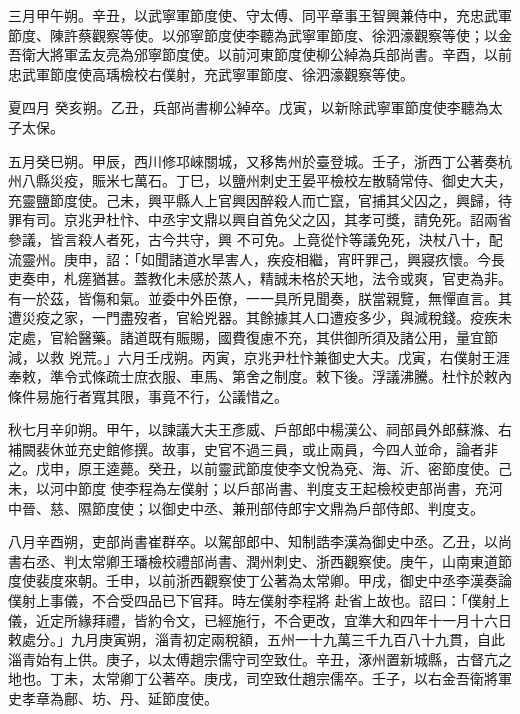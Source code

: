 \begin{pinyinscope}
 三月甲午朔。辛丑，以武寧軍節度使、守太傅、同平章事王智興兼侍中，充忠武軍節度、陳許蔡觀察等使。以邠寧節度使李聽為武寧軍節度、徐泗濠觀察等使；以金吾衛大將軍孟友亮為邠寧節度使。以前河東節度使柳公綽為兵部尚書。辛酉，以前忠武軍節度使高瑀檢校右僕射，充武寧軍節度、徐泗濠觀察等使。



 夏四月
 癸亥朔。乙丑，兵部尚書柳公綽卒。戊寅，以新除武寧軍節度使李聽為太子太保。



 五月癸巳朔。甲辰，西川修邛崍關城，又移雋州於臺登城。壬子，浙西丁公著奏杭州八縣災疫，賑米七萬石。丁巳，以鹽州刺史王晏平檢校左散騎常侍、御史大夫，充靈鹽節度使。己未，興平縣人上官興因醉殺人而亡竄，官捕其父囚之，興歸，待罪有司。京兆尹杜忭、中丞宇文鼎以興自首免父之囚，其孝可獎，請免死。詔兩省參議，皆言殺人者死，古今共守，興
 不可免。上竟從忭等議免死，決杖八十，配流靈州。庚申，詔：「如聞諸道水旱害人，疾疫相繼，宵旰罪己，興寢疚懷。今長吏奏申，札瘥猶甚。蓋教化未感於蒸人，精誠未格於天地，法令或爽，官吏為非。有一於茲，皆傷和氣。並委中外臣僚，一一具所見聞奏，朕當親覽，無憚直言。其遭災疫之家，一門盡歿者，官給兇器。其餘據其人口遭疫多少，與減稅錢。疫疾未定處，官給醫藥。諸道既有賑賜，國費復慮不充，其供御所須及諸公用，量宜節減，以救
 兇荒。」六月壬戌朔。丙寅，京兆尹杜忭兼御史大夫。戊寅，右僕射王涯奉敕，準令式條疏士庶衣服、車馬、第舍之制度。敕下後。浮議沸騰。杜忭於敕內條件易施行者寬其限，事竟不行，公議惜之。



 秋七月辛卯朔。甲午，以諫議大夫王彥威、戶部郎中楊漢公、祠部員外郎蘇滌、右補闕裴休並充史館修撰。故事，史官不過三員，或止兩員，今四人並命，論者非之。戊申，原王逵薨。癸丑，以前靈武節度使李文悅為兗、海、沂、密節度使。己未，以河中節度
 使李程為左僕射；以戶部尚書、判度支王起檢校吏部尚書，充河中晉、慈、隰節度使；以御史中丞、兼刑部侍郎宇文鼎為戶部侍郎、判度支。



 八月辛酉朔，吏部尚書崔群卒。以駕部郎中、知制誥李漢為御史中丞。乙丑，以尚書右丞、判太常卿王璠檢校禮部尚書、潤州刺史、浙西觀察使。庚午，山南東道節度使裴度來朝。壬申，以前浙西觀察使丁公著為太常卿。甲戌，御史中丞李漢奏論僕射上事儀，不合受四品已下官拜。時左僕射李程將
 赴省上故也。詔曰：「僕射上儀，近定所緣拜禮，皆約令文，已經施行，不合更改，宜準大和四年十一月十六日敕處分。」九月庚寅朔，淄青初定兩稅額，五州一十九萬三千九百八十九貫，自此淄青始有上供。庚子，以太傅趙宗儒守司空致仕。辛丑，涿州置新城縣，古督亢之地也。丁未，太常卿丁公著卒。庚戌，司空致仕趙宗儒卒。壬子，以右金吾衛將軍史孝章為鄜、坊、丹、延節度使。




\end{pinyinscope}
